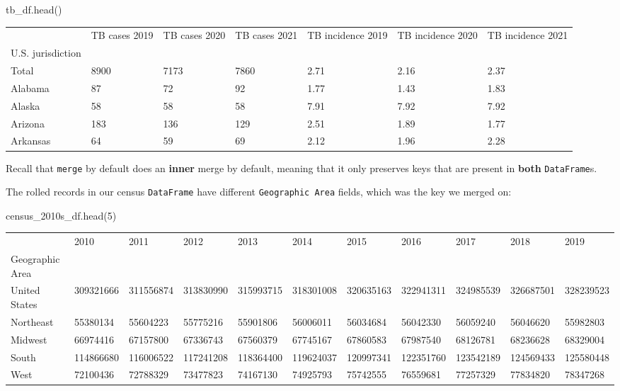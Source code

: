 \documentclass[
  letterpaper,
  DIV=11,
  numbers=noendperiod]{scrreprt}
\newenvironment{Shaded}{\begin{snugshade}}{\end{snugshade}}
\newcommand{\DecValTok}[1]{\textcolor[rgb]{0.68,0.00,0.00}{#1}}
\newcommand{\NormalTok}[1]{\textcolor[rgb]{0.00,0.23,0.31}{#1}}
\begin{document}
\begin{Shaded}
\begin{Highlighting}[]
\NormalTok{tb\_df.head()}
\end{Highlighting}
\end{Shaded}

\begin{longtable}[]{@{}lllllll@{}}
\toprule\noalign{}
& TB cases 2019 & TB cases 2020 & TB cases 2021 & TB incidence 2019 & TB
incidence 2020 & TB incidence 2021 \\
U.S. jurisdiction & & & & & & \\
\midrule\noalign{}
\endhead
\bottomrule\noalign{}
\endlastfoot
Total & 8900 & 7173 & 7860 & 2.71 & 2.16 & 2.37 \\
Alabama & 87 & 72 & 92 & 1.77 & 1.43 & 1.83 \\
Alaska & 58 & 58 & 58 & 7.91 & 7.92 & 7.92 \\
Arizona & 183 & 136 & 129 & 2.51 & 1.89 & 1.77 \\
Arkansas & 64 & 59 & 69 & 2.12 & 1.96 & 2.28 \\
\end{longtable}

Recall that \texttt{merge} by default does an \textbf{inner} merge by
default, meaning that it only preserves keys that are present in
\textbf{both} \texttt{DataFrame}s.

The rolled records in our census \texttt{DataFrame} have different
\texttt{Geographic\ Area} fields, which was the key we merged on:

\begin{Shaded}
\begin{Highlighting}[]
\NormalTok{census\_2010s\_df.head(}\DecValTok{5}\NormalTok{)}
\end{Highlighting}
\end{Shaded}

\begin{longtable}[]{@{}lllllllllll@{}}
\toprule\noalign{}
& 2010 & 2011 & 2012 & 2013 & 2014 & 2015 & 2016 & 2017 & 2018 & 2019 \\
Geographic Area & & & & & & & & & & \\
\midrule\noalign{}
\endhead
\bottomrule\noalign{}
\endlastfoot
United States & 309321666 & 311556874 & 313830990 & 315993715 &
318301008 & 320635163 & 322941311 & 324985539 & 326687501 & 328239523 \\
Northeast & 55380134 & 55604223 & 55775216 & 55901806 & 56006011 &
56034684 & 56042330 & 56059240 & 56046620 & 55982803 \\
Midwest & 66974416 & 67157800 & 67336743 & 67560379 & 67745167 &
67860583 & 67987540 & 68126781 & 68236628 & 68329004 \\
South & 114866680 & 116006522 & 117241208 & 118364400 & 119624037 &
120997341 & 122351760 & 123542189 & 124569433 & 125580448 \\
West & 72100436 & 72788329 & 73477823 & 74167130 & 74925793 & 75742555 &
76559681 & 77257329 & 77834820 & 78347268 \\
\end{longtable}
\end{document}
